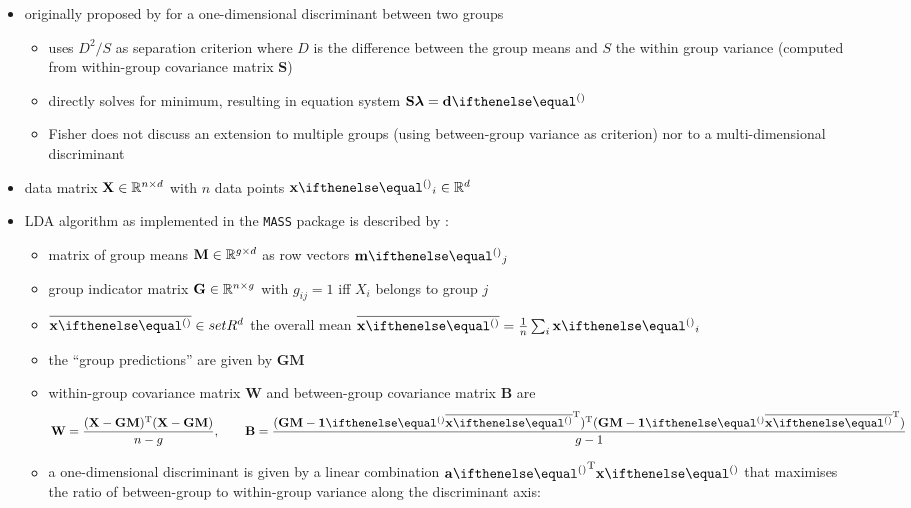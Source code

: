 \documentclass[a4paper]{article}
\begin{document}
\begin{itemize}
\item originally proposed by \citet{Fisher:36} for a one-dimensional discriminant between two groups
  \begin{itemize}
  \item uses $D^2 / S$ as separation criterion where $D$ is the difference between the group means and $S$ the within group variance (computed from within-group covariance matrix $\mathbf{S}$)
  \item directly solves for minimum, resulting in equation system $\mathbf{S} \boldsymbol{\lambda} = \vd$
  \item Fisher does not discuss an extension to multiple groups (using between-group variance as criterion) nor to a multi-dimensional discriminant
  \end{itemize}
\item data matrix $\mathbf{X}\in \mathbb{R}^{n\times d}$ with $n$ data points $\vx_i\in \setR^d$
\item LDA algorithm as implemented in the \texttt{MASS} package is described by \citet[331--332]{Venables:Ripley:02}:
  \begin{itemize}
  \item matrix of group means $\mathbf{M}\in \mathbb{R}^{g\times d}$ as row vectors $\vm_j$
  \item group indicator matrix $\mathbf{G}\in \mathbb{R}^{n\times g}$ with $g_{ij} = 1$ iff $X_i$ belongs to group $j$
  \item $\overline{\vx}\in setR^d$ the overall mean $\overline{\vx} = \frac1n \sum_i \vx_i$
  \item the ``group predictions'' are given by $\mathbf{G}\mathbf{M}$
  \item within-group covariance matrix $\mathbf{W}$ and between-group covariance matrix $\mathbf{B}$ are
    \begin{equation}
      \label{eq:lda:mass-W-B}
      \mathbf{W} = \frac{
        (\mathbf{X} - \mathbf{GM})\T (\mathbf{X} - \mathbf{GM})
      }{ n - g }
      ,\qquad
      \mathbf{B} = \frac{
        (\mathbf{GM} - \vone \overline{\vx}\T)\T (\mathbf{GM} - \vone \overline{\vx}\T)
      }{g - 1}
    \end{equation}
  \item a one-dimensional discriminant is given by a linear combination $\va\T \vx$ that maximises the ratio of between-group to within-group variance along the discriminant axis:
    \begin{equation}
      \label{eq:lda:mass-criterion}

\end{equation}
\end{itemize}
\end{itemize}
\end{document}

